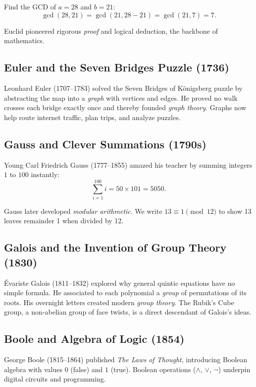\documentclass[12pt]{article}
\begin{document}
Find the GCD of \(a=28\) and \(b=21\):
\[
\gcd(28,21)=\gcd(21,28-21)=\gcd(21,7)=7.
\]

Euclid pioneered rigorous \emph{proof} and logical deduction, the backbone of mathematics.

\subsection*{Euler and the Seven Bridges Puzzle (1736)}

Leonhard Euler (1707–1783) solved the Seven Bridges of Königsberg puzzle by abstracting the map into a \emph{graph} with vertices and edges. He proved no walk crosses each bridge exactly once and thereby founded \emph{graph theory}. Graphs now help route internet traffic, plan trips, and analyze puzzles.

\subsection*{Gauss and Clever Summations (1790s)}

Young Carl Friedrich Gauss (1777–1855) amazed his teacher by summing integers \(1\) to \(100\) instantly:
\[
\sum_{i=1}^{100} i = 50 \times 101 = 5050.
\]

Gauss later developed \emph{modular arithmetic}. We write \(13 \equiv 1 \pmod{12}\) to show 13 leaves remainder 1 when divided by 12.

\subsection*{Galois and the Invention of Group Theory (1830)}

Évariste Galois (1811–1832) explored why general quintic equations have no simple formula. He associated to each polynomial a \emph{group} of permutations of its roots. His overnight letters created modern \emph{group theory}. The Rubik’s Cube group, a non‑abelian group of face twists, is a direct descendant of Galois’s ideas.

\subsection*{Boole and Algebra of Logic (1854)}

George Boole (1815–1864) published \emph{The Laws of Thought}, introducing Boolean algebra with values \(0\) (false) and \(1\) (true). Boolean operations (\(\land\), \(\lor\), \(\lnot\)) underpin digital circuits and programming.
\end{document}
